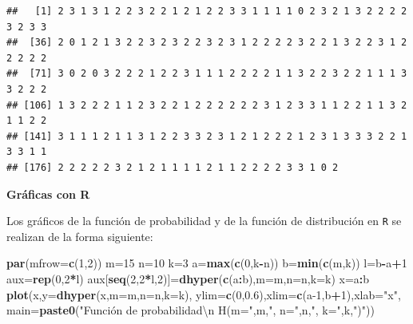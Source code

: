 \documentclass[]{book}
\newenvironment{Shaded}{\begin{snugshade}}{\end{snugshade}}
\newcommand{\CharTok}[1]{\textcolor[rgb]{0.31,0.60,0.02}{#1}}
\newcommand{\DataTypeTok}[1]{\textcolor[rgb]{0.13,0.29,0.53}{#1}}
\newcommand{\DecValTok}[1]{\textcolor[rgb]{0.00,0.00,0.81}{#1}}
\newcommand{\FloatTok}[1]{\textcolor[rgb]{0.00,0.00,0.81}{#1}}
\newcommand{\KeywordTok}[1]{\textcolor[rgb]{0.13,0.29,0.53}{\textbf{#1}}}
\newcommand{\NormalTok}[1]{#1}
\newcommand{\OperatorTok}[1]{\textcolor[rgb]{0.81,0.36,0.00}{\textbf{#1}}}
\newcommand{\StringTok}[1]{\textcolor[rgb]{0.31,0.60,0.02}{#1}}
\begin{document}
\begin{verbatim}
##   [1] 2 3 1 3 1 2 2 3 2 2 1 2 1 2 2 3 3 1 1 1 1 0 2 3 2 1 3 2 2 2 2 3 2 3 3
##  [36] 2 0 1 2 1 3 2 2 3 2 3 2 2 3 2 3 1 2 2 2 2 3 2 2 1 3 2 2 3 1 2 2 2 2 2
##  [71] 3 0 2 0 3 2 2 2 1 2 2 3 1 1 1 2 2 2 2 1 1 3 2 2 3 2 2 1 1 1 3 3 2 2 2
## [106] 1 3 2 2 2 1 1 2 3 2 2 1 2 2 2 2 2 2 3 1 2 3 3 1 1 2 2 1 1 3 2 1 1 2 2
## [141] 3 1 1 1 2 1 1 3 1 2 2 3 3 2 3 1 2 1 2 2 2 1 2 3 1 3 3 3 2 2 1 3 3 1 1
## [176] 2 2 2 2 2 3 2 1 2 1 1 1 1 2 1 1 2 2 2 2 3 3 1 0 2
\end{verbatim}

\textbf{Gráficas con R}

Los gráficos de la función de probabilidad y de la función de distribución en \texttt{R} se realizan de la forma siguiente:

\begin{Shaded}
\begin{Highlighting}[]
\KeywordTok{par}\NormalTok{(}\DataTypeTok{mfrow=}\KeywordTok{c}\NormalTok{(}\DecValTok{1}\NormalTok{,}\DecValTok{2}\NormalTok{))}
\NormalTok{m=}\DecValTok{15}
\NormalTok{n=}\DecValTok{10}
\NormalTok{k=}\DecValTok{3}
\NormalTok{a=}\KeywordTok{max}\NormalTok{(}\KeywordTok{c}\NormalTok{(}\DecValTok{0}\NormalTok{,k}\OperatorTok{-}\NormalTok{n))}
\NormalTok{b=}\KeywordTok{min}\NormalTok{(}\KeywordTok{c}\NormalTok{(m,k))}
\NormalTok{l=b}\OperatorTok{-}\NormalTok{a}\OperatorTok{+}\DecValTok{1}
\NormalTok{aux=}\KeywordTok{rep}\NormalTok{(}\DecValTok{0}\NormalTok{,}\DecValTok{2}\OperatorTok{*}\NormalTok{l)}
\NormalTok{aux[}\KeywordTok{seq}\NormalTok{(}\DecValTok{2}\NormalTok{,}\DecValTok{2}\OperatorTok{*}\NormalTok{l,}\DecValTok{2}\NormalTok{)]=}\KeywordTok{dhyper}\NormalTok{(}\KeywordTok{c}\NormalTok{(a}\OperatorTok{:}\NormalTok{b),}\DataTypeTok{m=}\NormalTok{m,}\DataTypeTok{n=}\NormalTok{n,}\DataTypeTok{k=}\NormalTok{k)}
\NormalTok{x=a}\OperatorTok{:}\NormalTok{b}
\KeywordTok{plot}\NormalTok{(x,}\DataTypeTok{y=}\KeywordTok{dhyper}\NormalTok{(x,}\DataTypeTok{m=}\NormalTok{m,}\DataTypeTok{n=}\NormalTok{n,}\DataTypeTok{k=}\NormalTok{k),}
  \DataTypeTok{ylim=}\KeywordTok{c}\NormalTok{(}\DecValTok{0}\NormalTok{,}\FloatTok{0.6}\NormalTok{),}\DataTypeTok{xlim=}\KeywordTok{c}\NormalTok{(a}\DecValTok{-1}\NormalTok{,b}\OperatorTok{+}\DecValTok{1}\NormalTok{),}\DataTypeTok{xlab=}\StringTok{"x"}\NormalTok{,}
  \DataTypeTok{main=}\KeywordTok{paste0}\NormalTok{(}\StringTok{"Función de probabilidad}\CharTok{\textbackslash{}n}\StringTok{ H(m="}\NormalTok{,m,}\StringTok{", n="}\NormalTok{,n,}\StringTok{", k="}\NormalTok{,k,}\StringTok{")"}\NormalTok{))}

\end{Highlighting}
\end{Shaded}
\end{document}
